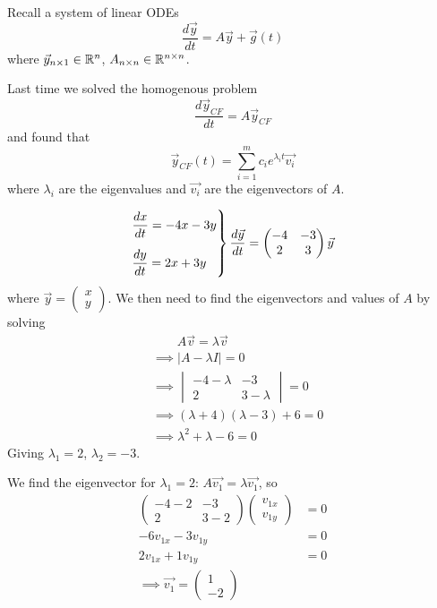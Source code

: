 \documentclass[10pt]{scrartcl}
\begin{document}
Recall a system of linear ODEs 
\[
  \frac{d\vec{y}}{dt} = A\vec{y} + \vec{g}(t)
\]
where $\vec{y}_{n \times 1} \in \mathbb{R}^n$, $A_{n \times n } \in \mathbb{R}^{n \times n}$. 

Last time we solved the homogenous problem
\[
  \frac{d\vec{y}_{CF}}{dt} = A\vec{y}_{CF}
\]
and found that 
\[
  \vec{y}_{CF}(t) = \sum_{i=1}^m c_ie^{\lambda_it}\vec{v_i}
\]
where $\lambda_i$ are the eigenvalues and $\vec{v_i}$ are the eigenvectors of $A$.\\

\begin{example}
\[
  \begin{rcases*}
  \dfrac{dx}{dt} = -4x - 3y\\[.2cm]
  \dfrac{dy}{dt} = 2x  +3y	
  \end{rcases*}
  \frac{d\vec{y}}{dt} = \begin{pmatrix}
  -4 & -3 \\ 2 & 3	
 \end{pmatrix}\vec{y} 
\]
where $\vec{y} = \begin{pmatrix}
 x \\ y	
 \end{pmatrix}$. We then need to find the eigenvectors and values of $A$ by solving
\begin{align*}
  &\qquad A\vec{v} = \lambda\vec{v}\\
  &\implies |A -\lambda I| = 0\\
  &\implies \begin{vmatrix}
  -4 -\lambda & -3 \\ 2 & 3-\lambda 	
 \end{vmatrix} = 0\\
 &\implies (\lambda+4)(\lambda-3) + 6 = 0\\
 &\implies \lambda^2 + \lambda - 6 = 0
\end{align*}
Giving $\lambda_1 =2$, $\lambda_2 = -3$. 

We find the eigenvector for $\lambda_1 = 2$: $A\vec{v_1} = \lambda\vec{v_1}$, so 
\begin{align*}
  \begin{pmatrix}
  -4 -2 & -3 \\ 2 & 3-2	
  \end{pmatrix}\begin{pmatrix}
 v_{1x} \\ v_{1y}	
\end{pmatrix}&= 0\\
-6v_{1x} -3v_{1y} &= 0\\
2v_{1x} + 1v_{1y} &= 0\\[.3cm]
\implies \vec{v_1} = \begin{pmatrix}
 1 \\ -2	
 \end{pmatrix}&
 \end{align*}
 

\end{example}
\end{document}
